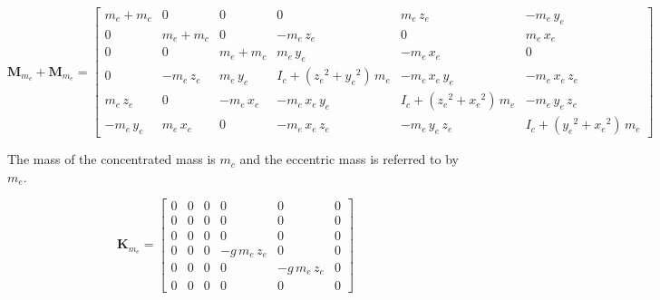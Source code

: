 \documentclass{article}
\begin{document}
\begin{small}
    \begin{equation}
        \mathbf{M}_{m_c} + \mathbf{M}_{m_e}  = 
        \begin{bmatrix}
         m_{e}+m_{c}   & 0             & 0             & 0                                             & m_{e}\,z_{e}                                  & -m_{e}\,y_{e}        \\ 
         0             & m_{e}+m_{c}   & 0             & -m_{e}\,z_{e}                                 & 0                                             & m_{e}\,x_{e}         \\ 
         0             & 0              & m_{e}+m_{c}   & m_{e}\,y_{e}                                  & -m_{e}\,x_{e}                                 & 0                    \\ 
         0             & -m_{e}\,z_{e} & m_{e}\,y_{e}  & I_{c}+\left({z_{e}}^2+{y_{e}}^2\right)\,m_{e} & -m_{e}\,x_{e}\,y_{e}                          & -m_{e}\,x_{e}\,z_{e} \\ 
         m_{e}\,z_{e}  & 0             & -m_{e}\,x_{e} & -m_{e}\,x_{e}\,y_{e}                          & I_{c}+\left({z_{e}}^2+{x_{e}}^2\right)\,m_{e} & -m_{e}\,y_{e}\,z_{e} \\
         -m_{e}\,y_{e} & m_{e}\,x_{e}  & 0             & -m_{e}\,x_{e}\,z_{e}                          & -m_{e}\,y_{e}\,z_{e}                          & I_{c}+\left({y_{e}}^2+{x_{e}}^2\right)\,m_{e} 
        \end{bmatrix}
        \label{eq:fea:Mtop}
    \end{equation}
\end{small}

The mass of the concentrated mass is $m_c$ and the eccentric mass is referred to by $m_e$. 

\begin{small}
    \begin{equation}
        \mathbf{K}_{m_e} =
        \begin{bmatrix}
       0 & 0 & 0 &         0        &        0         & 0 \\ 
       0 & 0 & 0 &         0        &        0         & 0 \\ 
       0 & 0 & 0 &         0        &        0         & 0 \\ 
       0 & 0 & 0 & -g\,m_{e}\,z_{e} &        0         & 0 \\ 
       0 & 0 & 0 &         0        & -g\,m_{e}\,z_{e} & 0 \\ 
       0 & 0 & 0 &         0        &        0         & 0
        \end{bmatrix}
        \label{eq:fea:K_m_ecc}
    \end{equation}
\end{small}
\end{document}
